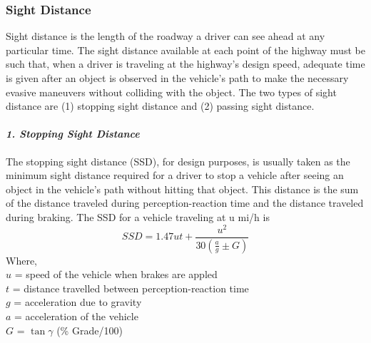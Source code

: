 \subsubsection{Sight Distance}
Sight distance is the length of the roadway a driver can see ahead at any particular time. The sight distance available at each point of the highway must be such that, when a driver is traveling at the highway’s design speed, adequate time is given after an object is observed in the vehicle’s path to make the necessary evasive maneuvers without colliding with the object. The two types of sight distance are (1) stopping sight distance and (2) passing sight distance.
\paragraph{\emph{1. Stopping Sight Distance}}
The stopping sight distance (SSD), for design purposes, is usually taken as the minimum sight distance required for a driver to stop a vehicle after seeing an object in the vehicle’s path without hitting that object. This distance is the sum of the distance traveled during perception-reaction time and the distance traveled during braking. The SSD for a vehicle traveling at u mi/h is
\begin{equation}
	SSD = 1.47ut + \frac{u^2}{30\left(\frac{a}{g} \pm G \right)}
\end{equation}
Where,\\
\hspace*{10mm}$u$ = speed of the vehicle when brakes are appled\\
\hspace*{10mm}$t$ = distance travelled between perception-reaction time\\
\hspace*{10mm}$g$ = acceleration due to gravity\\
\hspace*{10mm}$a$ = acceleration of the vehicle\\
\hspace*{10mm}$G$ = $\tan \gamma$ (\% Grade/100)\\\\
